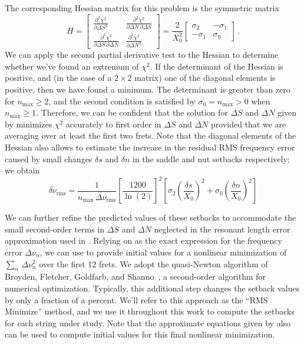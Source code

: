 The corresponding Hessian matrix for this problem is the symmetric matrix
 \begin{equation}
H = \begin{bmatrix}
      \frac{\partial^2 \chi^2}{\partial \Delta S^2} & \frac{\partial^2 \chi^2}{\partial \Delta N\, \partial \Delta S} \\
      \frac{\partial^2 \chi^2}{\partial \Delta S\, \partial \Delta N} & \frac{\partial^2 \chi^2}{\partial \Delta N^2}
    \end{bmatrix}
  = \frac{2}{X_0^2} \begin{bmatrix}
      \sigma_2 & -\sigma_1 \\
      -\sigma_1 & \sigma_0
    \end{bmatrix}\, .
 \end{equation}
We can apply the second partial derivative test to the Hessian to determine whether we've found an extremum of $\chi^2$. If the determinant of the Hessian is positive, and (in the case of a $2 \times 2$ matrix) one of the diagonal elements is positive, then we have found a minimum. The determinant is greater than zero for $n_\text{max} \ge 2$, and the second condition is satisfied by $\sigma_0 = n_\text{max} > 0$ when $n_\text{max} \ge 1$. Therefore, we can be confident that the solution for $\Delta S$ and $\Delta N$ given by  minimizes $\chi^2$ accurately to first order in $\Delta S$ and $\Delta N$ provided that we are averaging over at least the first two frets. Note that the diagonal elements of the Hessian also allows to estimate the increase in the residual RMS frequency error caused by small changes $\delta s$ and $\delta n$ in the saddle and nut setbacks respectively; we obtain
\begin{equation}
  \overline{\delta \nu}_\text{rms} = \frac{1}{n_\text{max}\, \overline{\Delta \nu}_\text{rms}} \left[ \frac{1200}{\ln(2)} \right]^2 \left[ \sigma_2 \left(\frac{\delta s}{X_0}\right)^2 + \sigma_0 \left(\frac{\delta n}{X_0}\right)^2\right]
\end{equation}

We can further refine the predicted values of these setbacks to accommodate the small second-order terms in $\Delta S$ and $\Delta N$ neglected in the resonant length error approximation used in . Relying on  as the exact expression for the frequency error $\Delta \nu_n$, we can use  to provide initial values for a nonlinear minimization of $\sum_n\, \Delta \nu_n^2$ over the first 12 frets. We adopt the quasi-Newton algorithm of Broyden, Fletcher, Goldfarb, and Shanno~\cite{ref:nocedal2006no}, a second-order algorithm for numerical optimization. Typically, this additional step changes the setback values by only a fraction of a percent. We'll refer to this approach as the ``RMS Minimize'' method, and we use it throughout this work to compute the setbacks for each string under study. Note that the approximate equations given by  also can be used to compute initial values for this final nonlinear minimization.

